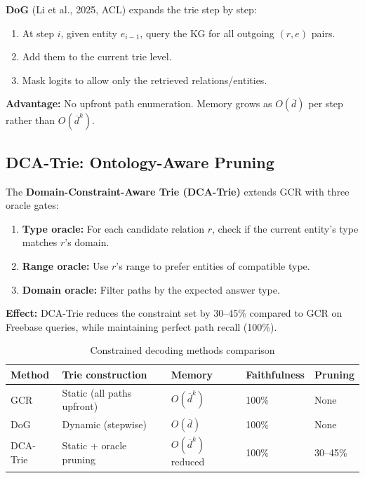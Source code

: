 \documentclass[11pt,a4paper,oneside,openany]{book}
\theoremstyle{definition}
\theoremstyle{plain}
\theoremstyle{remark}
\begin{document}
\textbf{DoG} (Li et al., 2025, ACL) expands the trie step by step:

\begin{enumerate}
	\item At step $i$, given entity $e_{i-1}$, query the KG for all outgoing $(r, e)$ pairs.
	\item Add them to the current trie level.
	\item Mask logits to allow only the retrieved relations/entities.
\end{enumerate}

\textbf{Advantage:} No upfront path enumeration. Memory grows as $O(\overline{d})$ per step rather than $O(\overline{d}^k)$.

\subsection{DCA-Trie: Ontology-Aware Pruning}

The \textbf{Domain-Constraint-Aware Trie (DCA-Trie)} extends GCR with three oracle gates:

\begin{enumerate}
	\item \textbf{Type oracle:} For each candidate relation $r$, check if the current entity's type matches $r$'s domain.
	\item \textbf{Range oracle:} Use $r$'s range to prefer entities of compatible type.
	\item \textbf{Domain oracle:} Filter paths by the expected answer type.
\end{enumerate}

\textbf{Effect:} DCA-Trie reduces the constraint set by 30--45\% compared to GCR on Freebase queries, while maintaining perfect path recall (100\%).

\begin{table}[h]
	\centering
	\caption{Constrained decoding methods comparison}
	\label{tab:constrained-compare}
	\begin{tabular}{lp{2.5cm}p{2cm}p{2.5cm}p{2.5cm}}
		\toprule
		Method   & Trie construction          & Memory                      & Faithfulness & Pruning  \\
		\midrule
		GCR      & Static (all paths upfront) & $O(\overline{d}^k)$         & 100\%        & None     \\
		DoG      & Dynamic (stepwise)         & $O(\overline{d})$           & 100\%        & None     \\
		DCA-Trie & Static + oracle pruning    & $O(\overline{d}^k)$ reduced & 100\%        & 30--45\% \\
		\bottomrule
	\end{tabular}
\end{table}
\end{document}
